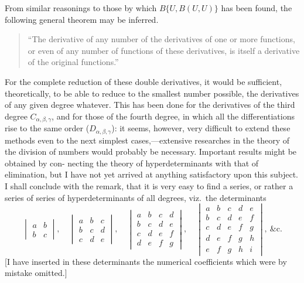 \documentclass[11pt,a4paper]{book}
\begin{document}
From similar reasonings to those by which $B\{U, B(U, U)\}$ has been found, the
following general theorem may be inferred.

\begin{quote}
``The derivative of any number of the derivatives of one or more functions, or
even of any number of functions of these derivatives, is itself a derivative of the
original functions.''
\end{quote}

For the complete reduction of these double derivatives, it would be sufficient,
theoretically, to be able to reduce to the smallest number possible, the derivatives of
any given degree whatever. This has been done for the derivatives of the third degree
$C_{\alpha,\beta,\gamma}$, and for those of the fourth degree, in which all the differentiations rise to
the same order ($D_{\alpha,\beta,\gamma}$): it seems, however, very difficult to extend these methods even
to the next simplest cases,---extensive researches in the theory of the division of
numbers would probably be necessary. Important results might be obtained by con-
necting the theory of hyperdeterminants with that of elimination, but I have not yet
arrived at anything satisfactory upon this subject. I shall conclude with the remark,
that it is very easy to find a series, or rather a series of series of hyperdeterminants
of all degrees, viz.\ the determinants
\[
\begin{vmatrix}
a & b\\
b & c
\end{vmatrix},\quad
\begin{vmatrix}
a & b & c\\
b & c & d\\
c & d & e
\end{vmatrix},\quad
\begin{vmatrix}
a & b & c & d\\
b & c & d & e\\
c & d & e & f\\
d & e & f & g
\end{vmatrix},\quad
\begin{vmatrix}
a & b & c & d & e\\
b & c & d & e & f\\
c & d & e & f & g\\
d & e & f & g & h\\
e & f & g & h & i
\end{vmatrix},\ \&\text{c.}
\]
[I have inserted in these determinants the numerical coefficients which were by
mistake omitted.]
\end{document}
